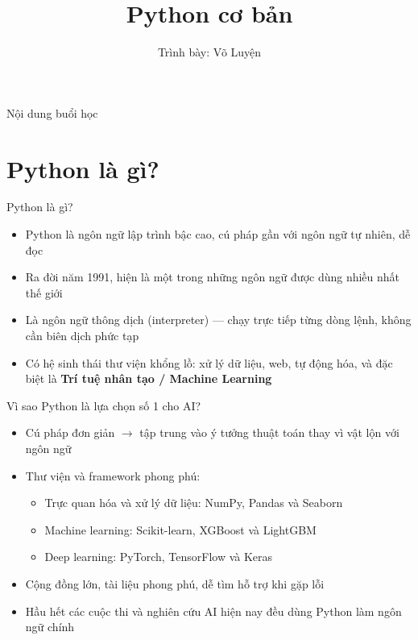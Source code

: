 \documentclass[11pt]{beamer}
\title{Python cơ bản}
\author{Trình bày: Võ Luyện}
\date{}
\begin{document}
\frame{\titlepage}

\begin{frame}{Nội dung buổi học}
\tableofcontents
\end{frame}

\section{Python là gì?}

\begin{frame}{Python là gì?}
\begin{itemize}
  \item Python là ngôn ngữ lập trình bậc cao, cú pháp gần với ngôn ngữ tự nhiên, dễ đọc
  \item Ra đời năm 1991, hiện là một trong những ngôn ngữ được dùng nhiều nhất thế giới
  \item Là ngôn ngữ thông dịch (interpreter) — chạy trực tiếp từng dòng lệnh, không cần biên dịch phức tạp
  \item Có hệ sinh thái thư viện khổng lồ: xử lý dữ liệu, web, tự động hóa, và đặc biệt là \textbf{Trí tuệ nhân tạo / Machine Learning}
\end{itemize}
\end{frame}

\begin{frame}{Vì sao Python là lựa chọn số 1 cho AI?}
\begin{itemize}
  \item Cú pháp đơn giản $\to$ tập trung vào ý tưởng thuật toán thay vì vật lộn với ngôn ngữ
  \item Thư viện và framework phong phú:
  \begin{itemize}
    \item Trực quan hóa và xử lý dữ liệu: NumPy, Pandas và Seaborn
    \item Machine learning: Scikit-learn, XGBoost và LightGBM
    \item Deep learning: PyTorch, TensorFlow và Keras
  \end{itemize}
  \item Cộng đồng lớn, tài liệu phong phú, dễ tìm hỗ trợ khi gặp lỗi
  \item Hầu hết các cuộc thi và nghiên cứu AI hiện nay đều dùng Python làm ngôn ngữ chính
\end{itemize}
\end{frame}

\end{document}
